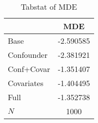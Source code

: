 \begin{table}[htbp]\centering
\def\sym#1{\ifmmode^{#1}\else\(^{#1}\)\fi}
\caption{Tabstat of MDE}
\begin{tabular}{l*{1}{c}}
\hline\hline
            &         MDE\\
\hline
Base        &   -2.590585\\
Confounder  &   -2.381921\\
Conf+Covar  &   -1.351407\\
Covariates  &   -1.404495\\
Full        &   -1.352738\\
\hline
\(N\)       &        1000\\
\hline\hline
\end{tabular}
\end{table}
